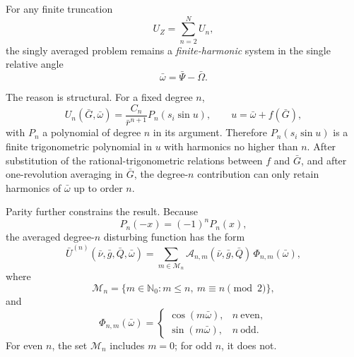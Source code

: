 \documentclass[11pt]{article}
\begin{document}
For any finite truncation
\begin{equation}
U_Z = \sum_{n=2}^{N} U_n,
\end{equation}
the singly averaged problem remains a \emph{finite-harmonic} system in the
single relative angle
\begin{equation}
\bar\omega = \bar\Psi - \bar\Omega.
\end{equation}

The reason is structural. For a fixed degree $n$,
\begin{equation}
U_n(\bar G,\bar\omega)
=
\frac{C_n}{\bar r^{n+1}} P_n\!\left(s_i \sin u\right),
\qquad
u = \bar\omega + f(\bar G),
\end{equation}
with $P_n$ a polynomial of degree $n$ in its argument. Therefore
$P_n(s_i\sin u)$ is a finite trigonometric polynomial in $u$ with harmonics no
higher than $n$. After substitution of the rational-trigonometric relations
between $f$ and $\bar G$, and after one-revolution averaging in $\bar G$, the
degree-$n$ contribution can only retain harmonics of $\bar\omega$ up to order
$n$.

Parity further constrains the result. Because
\begin{equation}
P_n(-x) = (-1)^n P_n(x),
\end{equation}
the averaged degree-$n$ disturbing function has the form
\begin{equation}
\bar U^{(n)}(\bar\nu,\bar g,\bar Q,\bar\omega)
=
\sum_{m\in\mathcal M_n}
\mathcal A_{n,m}(\bar\nu,\bar g,\bar Q)\,\Phi_{n,m}(\bar\omega),
\label{eq:Un_fourier}
\end{equation}
where
\begin{equation}
\mathcal M_n = \{m \in \mathbb N_0: m \le n,\ m \equiv n \pmod 2\},
\end{equation}
and
\begin{equation}
\Phi_{n,m}(\bar\omega)
=
\begin{cases}
\cos(m\bar\omega), & n \ \text{even}, \\
\sin(m\bar\omega), & n \ \text{odd}.
\end{cases}
\label{eq:Phi_parity}
\end{equation}
For even $n$, the set $\mathcal M_n$ includes $m=0$; for odd $n$, it does not.
\end{document}
